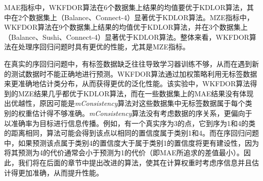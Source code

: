 MAE指标中，WKFDOR算法在6个数据集上结果的均值要优于KDLOR算法，其中在2个数据集上（Balance、Connect-4）显著优于KDLOR算法。MZE指标中，WKFDOR算法在9个数据集上结果的均值优于KDLOR算法，并在3个数据集上（Balance、Sushi、Connect-4）显著优于KDLOR算法。整体来看，WKFDOR算法在处理序回归问题时具有更优的性能，尤其是MZE指标。

在真实的序回归问题中，有标签数据缺乏往往导致学习器训练不够，从而在遇到新的测试数据时不能正确地进行预测。WKFDOR算法通过加权策略利用无标签数据来更准确地估计类分布，从而获得更优的泛化性能。该实验中，WKFDOR算法得到的MZE结果几乎都优于KDLOR算法，而在一些数据集上的MAE结果没有体现出优越性，原因可能是\textit{mConsistency}算法对这些数据集中无标签数据属于每个类别的权重估计得不够准确。\textit{mConsistency}算法没有考虑数据的序关系，更偏向于以准确率为目标进行信息传播。例如，有一个真实序为3的点，它到序为1和4的类的距离相同，算法可能会得到该点以相同的置信度属于类别1和4。而在序回归问题中，如果预测该点属于类别4的置信度大于属于类别1的置信度将更有建设性，因为将其预测为4的代价通常会小于预测为1的代价（即MAE所追求的差值最小）。因此，我们将在后面的章节中提出改进的算法，使其在计算权重时考虑序信息并且估计得更加准确，从而提升性能。

